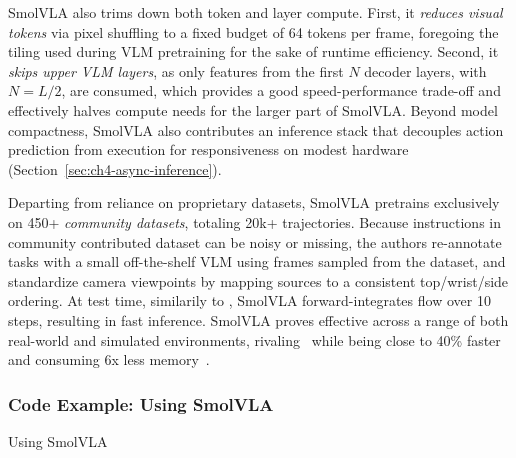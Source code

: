 SmolVLA also trims down both token and layer compute.
First, it \emph{reduces visual tokens} via pixel shuffling to a fixed budget of 64 tokens per frame, foregoing the tiling used during VLM pretraining for the sake of runtime efficiency. 
Second, it \emph{skips upper VLM layers}, as only features from the first \(N\) decoder layers, with \(N=L/2\), are consumed, which provides a good speed-performance trade-off and effectively halves compute needs for the larger part of SmolVLA.
Beyond model compactness, SmolVLA also contributes an inference stack that decouples action prediction from execution for responsiveness on modest hardware (Section~\ref{sec:ch4-async-inference}).

Departing from reliance on proprietary datasets, SmolVLA pretrains exclusively on 450+ \emph{community datasets}, totaling 20k+ trajectories. 
Because instructions in community contributed dataset can be noisy or missing, the authors re-annotate tasks with a small off-the-shelf VLM using frames sampled from the dataset, and standardize camera viewpoints by mapping sources to a consistent top/wrist/side ordering.
At test time, similarily to \pizero, SmolVLA forward-integrates flow over 10 steps, resulting in fast inference.
SmolVLA proves effective across a range of both real-world and simulated environments, rivaling \pizero~while being close to 40\% faster and consuming 6x less memory~\citep{shukorSmolVLAVisionLanguageActionModel2025}.

\subsubsection{Code Example: Using SmolVLA}
\begin{pbox}[label={ex:using-smolvla}]{Using SmolVLA}
    \inputminted{python}{snippets/ch5/02_using_smolvla.py}
\end{pbox}
